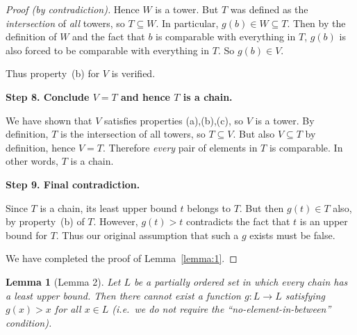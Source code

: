 \documentclass[12pt]{article}
\theoremstyle{definition} %
\newtheorem{lemma}{Lemma}
\theoremstyle{plain} %
\begin{document}
\begin{proof}[Proof (by contradiction)]
    Hence $W$ is a tower.  But $T$ was defined as the \emph{intersection} 
    of \emph{all} towers, so $T \subseteq W$.  In particular, 
    $g(b) \in W \subseteq T$.  Then by the definition of $W$ and the fact 
    that $b$ is comparable with everything in $T$, $g(b)$ is also forced 
    to be comparable with everything in $T$.  So $g(b) \in V$.
    
    Thus property~(b) for $V$ is verified.
    
    \medskip
    
    \textbf{Step 8. Conclude $V = T$ and hence $T$ is a chain.}
    
    We have shown that $V$ satisfies properties (a),(b),(c), so $V$ is a tower.  
    By definition, $T$ is the intersection of all towers, so $T \subseteq V$.  
    But also $V \subseteq T$ by definition, hence $V = T$.  Therefore 
    \emph{every} pair of elements in $T$ is comparable.  In other words, 
    $T$ is a chain.
    
    \medskip
    
    \textbf{Step 9. Final contradiction.}
    
    Since $T$ is a chain, its least upper bound $t$ belongs to $T$.  
    But then $g(t) \in T$ also, by property~(b) of $T$.  However, $g(t) > t$ 
    contradicts the fact that $t$ is an upper bound for $T$.  
    Thus our original assumption that such a $g$ exists must be false.
    
    We have completed the proof of Lemma~\ref{lemma:1}.
    \end{proof}
    
    \bigskip
    
    \begin{lemma}[Lemma 2]
    \label{lemma:2}
    \textit{Let $L$ be a partially ordered set in which every chain has a least 
    upper bound. Then there cannot exist a function $g : L \to L$ satisfying 
    $g(x) > x$ for all $x \in L$ (i.e.\ we do \emph{not} require the 
    ``no-element-in-between'' condition).}
    \end{lemma}
    
\end{document}
